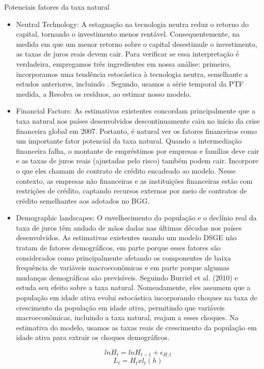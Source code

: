Potenciais fatores da taxa natural
\begin{itemize}
    \item Neutral Technology: A estagnação na tecnologia neutra reduz o retorno do capital, tornando o investimento menos rentável. Consequentemente, na medida em que um menor retorno sobre o capital desestimule o investimento, as taxas de juros reais devem cair. Para verificar se essa interpretação é verdadeira, empregamos três ingredientes em nossa análise: primeiro, incorporamos uma tendência estocástica à tecnologia neutra, semelhante a estudos anteriores, incluindo \citet{Neri:2018}. Segundo, usamos a série temporal da PTF medida, a Resolva os resíduos, ao estimar nosso modelo.
    
    \item Financial Factors: As estimativas existentes concordam principalmente que a taxa natural nos países desenvolvidos descontinuamente caiu no início da crise financeira global em 2007. Portanto, é natural ver os fatores financeiros como um importante fator potencial da taxa natural. Quando a intermediação financeira falha, o montante de empréstimos por empresas e famílias deve cair e as taxas de juros reais (ajustadas pelo risco) também podem cair. Incorpore o que eles chamam de contrato de crédito encadeado ao modelo. Nesse contexto, as empresas não financeiras e as instituições financeiras estão com restrições de crédito, captando recursos externos por meio de contratos de crédito semelhantes aos adotados no BGG.
    
    \item Demographic landscapes: O envelhecimento da população e o declínio real da taxa de juros têm andado de mãos dadas nas últimas décadas nos países desenvolvidos. As estimativas existentes usando um modelo DSGE não tratam de fatores demográficos, em parte porque esses fatores são considerados como principalmente afetando os componentes de baixa frequência de variáveis macroeconômicas e em parte porque algumas mudanças demográficas são previsíveis. Seguindo Burriel et al. (2010) e estuda seu efeito sobre a taxa natural. Nomeadamente, eles assumem que a população em idade ativa evolui estocástica incorporando choques na taxa de crescimento da população em idade ativa, permitindo que variáveis macroeconômicas, incluindo a taxa natural, reajam a esses choques. Na estimativa do modelo, usamos as taxas reais de crescimento da população em idade ativa para extrair os choques demográficos.
    
    $$ln H_t = ln H_{t-1} + \epsilon_{H,t}$$
    $$L_t = H_t x l_t(h) $$
    

\end{itemize}
